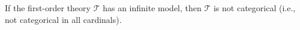 If the first-order theory $\mathcal{T}$ has an infinite model, then $\mathcal{T}$ is not categorical (i.e., not categorical in all cardinals).
